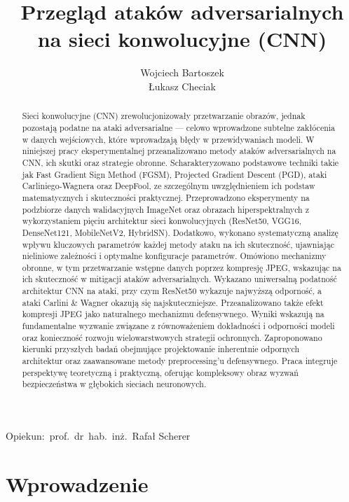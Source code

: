 \documentclass[12pt]{article}
\title{Przegląd ataków adversarialnych na sieci konwolucyjne (CNN)}
\author{
    Wojciech Bartoszek \\
    Łukasz Checiak
}
\date{}
\begin{document}
\maketitle

\begin{center}
    Opiekun:\ prof.\ dr\ hab.\ inż.\ Rafał Scherer
\end{center}

\begin{abstract}
    Sieci konwolucyjne (CNN) zrewolucjonizowały przetwarzanie obrazów, jednak pozostają podatne na ataki adversarialne --- celowo wprowadzone subtelne zakłócenia w danych wejściowych, które wprowadzają błędy w przewidywaniach modeli. W niniejszej pracy eksperymentalnej przeanalizowano metody ataków adversarialnych na CNN, ich skutki oraz strategie obronne. Scharakteryzowano podstawowe techniki takie jak Fast Gradient Sign Method (FGSM), Projected Gradient Descent (PGD), ataki Carliniego-Wagnera oraz DeepFool, ze szczególnym uwzględnieniem ich podstaw matematycznych i skuteczności praktycznej. Przeprowadzono eksperymenty na podzbiorze danych walidacyjnych ImageNet oraz obrazach hiperspektralnych z wykorzystaniem pięciu architektur sieci konwolucyjnych (ResNet50, VGG16, DenseNet121, MobileNetV2, HybridSN). Dodatkowo, wykonano systematyczną analizę wpływu kluczowych parametrów każdej metody ataku na ich skuteczność, ujawniając nieliniowe zależności i optymalne konfiguracje parametrów. Omówiono mechanizmy obronne, w tym przetwarzanie wstępne danych poprzez kompresję JPEG, wskazując na ich skuteczność w mitigacji ataków adversarialnych. Wykazano uniwersalną podatność architektur CNN na ataki, przy czym ResNet50 wykazuje najwyższą odporność, a ataki Carlini \& Wagner okazują się najskuteczniejsze. Przeanalizowano także efekt kompresji JPEG jako naturalnego mechanizmu defensywnego. Wyniki wskazują na fundamentalne wyzwanie związane z równoważeniem dokładności i odporności modeli oraz konieczność rozwoju wielowarstwowych strategii ochronnych. Zaproponowano kierunki przyszłych badań obejmujące projektowanie inherentnie odpornych architektur oraz zaawansowane metody preprocessing'u defensywnego. Praca integruje perspektywę teoretyczną i praktyczną, oferując kompleksowy obraz wyzwań bezpieczeństwa w głębokich sieciach neuronowych.
\end{abstract}

\section{Wprowadzenie}
\end{document}

